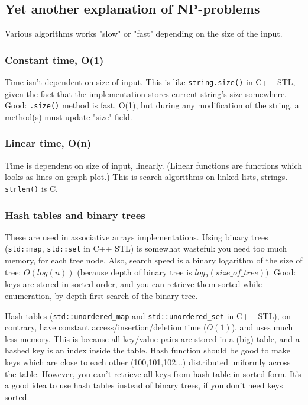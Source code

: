 \subsection{Yet another explanation of NP-problems}

Various algorithms works "slow" or "fast" depending on the size of the input.

\subsubsection{Constant time, O(1)}

Time isn't dependent on size of input.
This is like \verb|string.size()| in C++ STL, given the fact that the implementation stores current string's size somewhere.
Good: \verb|.size()| method is fast, O(1), but during any modification of the string, a method(s) must update "size" field.

\subsubsection{Linear time, O(n)}

Time is dependent on size of input, linearly.
(Linear functions are functions which looks as lines on graph plot.)
This is search algorithms on linked lists, strings.
\verb|strlen()| is C.

\subsubsection{Hash tables and binary trees}

These are used in associative arrays implementations.
Using binary trees (\verb|std::map|, \verb|std::set| in C++ STL) is somewhat wasteful: you need too much memory, for each tree node.
Also, search speed is a binary logarithm of the size of tree: $O(log(n))$ (because depth of binary tree is $log_2(size\_of\_tree))$.
Good: keys are stored in sorted order, and you can retrieve them sorted while enumeration, by depth-first search of the binary tree.

Hash tables (\verb|std::unordered_map| and \verb|std::unordered_set| in C++ STL), on contrary, have constant access/insertion/deletion time
($O(1)$), and uses much less memory.
This is because all key/value pairs are stored in a (big) table, and a hashed key is an index inside the table.
Hash function should be good to make keys which are close to each other (100,101,102...) distributed uniformly across the table.
However, you can't retrieve all keys from hash table in sorted form.
It's a good idea to use hash tables instead of binary trees, if you don't need keys sorted.

